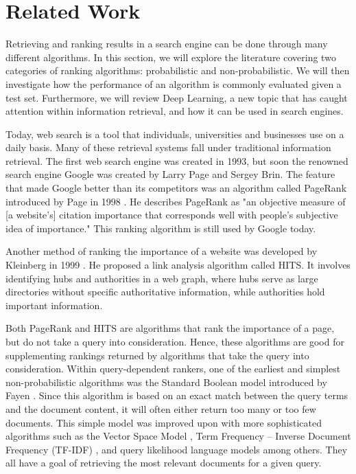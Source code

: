 \section{Related Work}
Retrieving and ranking results in a search engine can be done through many different algorithms. In this section, we will explore the literature covering two categories of ranking algorithms: probabilistic and non-probabilistic. We will then investigate how the performance of an algorithm is commonly evaluated given a test set. Furthermore, we will review Deep Learning, a new topic that has caught attention within information retrieval, and how it can be used in search engines.

Today, web search is a tool that individuals, universities and businesses use on a daily basis. Many of these retrieval systems fall under traditional information retrieval. The first web search engine was created in 1993, but soon the renowned search engine Google was created by Larry Page and Sergey Brin. The feature that made Google better than its competitors was an algorithm called PageRank introduced by Page in 1998 \cite{brin1998anatomy}. He describes PageRank as "an objective measure of [a website's] citation importance that corresponds well with people's subjective idea of importance." This ranking algorithm is still used by Google today.

Another method of ranking the importance of a website was developed by Kleinberg in 1999 \cite{kleinberg1999authoritative}. He proposed a link analysis algorithm called HITS. It involves identifying hubs and authorities in a web graph, where hubs serve as large directories without specific authoritative information, while authorities hold important information. 

Both PageRank and HITS are algorithms that rank the importance of a page, but do not take a query into consideration. Hence, these algorithms are good for supplementing rankings returned by algorithms that take the query into consideration. Within query-dependent rankers, one of the earliest and simplest non-probabilistic algorithms was the Standard Boolean model introduced by Fayen \cite{lancaster1973information}. Since this algorithm is based on an exact match between the query terms and the document content, it will often either return too many or too few documents. This simple model was improved upon with more sophisticated algorithms such as the Vector Space Model \cite{salton1975vector}, Term Frequency -- Inverse Document Frequency (TF-IDF) \cite{salton1983mcgill}, and query likelihood language models \cite{zhai2001model} among others. They all have a goal of retrieving the most relevant documents for a given query.

